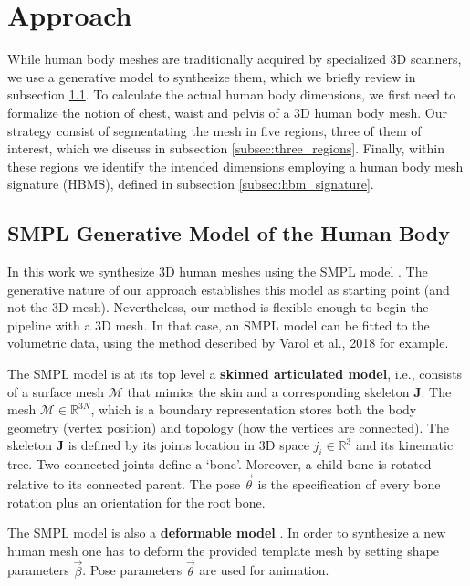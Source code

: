 \documentclass[runningheads, orivec]{llncs}
\begin{document}
\section{Approach}\label{sec:approach}
While human body 
meshes are traditionally acquired by specialized 3D scanners, we use a 
generative model to synthesize them, which we briefly review in 
subsection \ref{subsec:smpl_model}. To calculate the actual human body 
dimensions, we first need to formalize the 
notion of chest, waist and pelvis of a 3D human body mesh. Our strategy consist 
of segmentating the mesh in five regions, 
three of them of interest, which we 
discuss in subsection \ref{subsec:three_regions}. Finally, within these regions 
we identify the intended dimensions employing a human body mesh signature 
(HBMS), 
defined in subsection \ref{subsec:hbm_signature}.

\subsection{SMPL Generative Model of the Human Body}\label{subsec:smpl_model}
In this work we synthesize 3D human meshes using the SMPL
model \cite{Loper.2015}. The generative nature of our approach establishes this 
model as starting point (and not the 3D mesh). Nevertheless, our method is 
flexible enough to begin the pipeline with a 3D mesh. In that case, an SMPL 
model can be fitted to the volumetric data, using the method described by 
Varol et al., 2018 \cite{varol18_bodynet} for example.

The SMPL model is at its top level a \textbf{skinned articulated 
model}, i.e., 
consists of a 
surface mesh $\mathcal{M}$ that mimics the skin and a corresponding skeleton 
$\mathbf{J}$. The mesh $\mathcal{M} \in \mathbb{R}^{3N}$, which is a boundary 
representation stores 
both the body geometry (vertex position) and topology (how the vertices are 
connected). The skeleton $\mathbf{J}$ is defined by its joints location in 3D 
space $j_i \in \mathbb{R}^3$  and its kinematic tree. Two 
connected 
joints define a `bone'. Moreover, a child bone is rotated relative to 
its 
connected parent. The pose $\vec{\theta}$ is the specification of every bone 
rotation plus an orientation for the root bone.

The SMPL model is also a \textbf{deformable model} 
\cite{Terzopoulos.1987}. In order to 
synthesize a 
new human mesh one has to deform the provided template mesh by 
setting shape parameters $\vec{\beta}$. Pose parameters $\vec{\theta}$ are used 
for animation.
\end{document}
